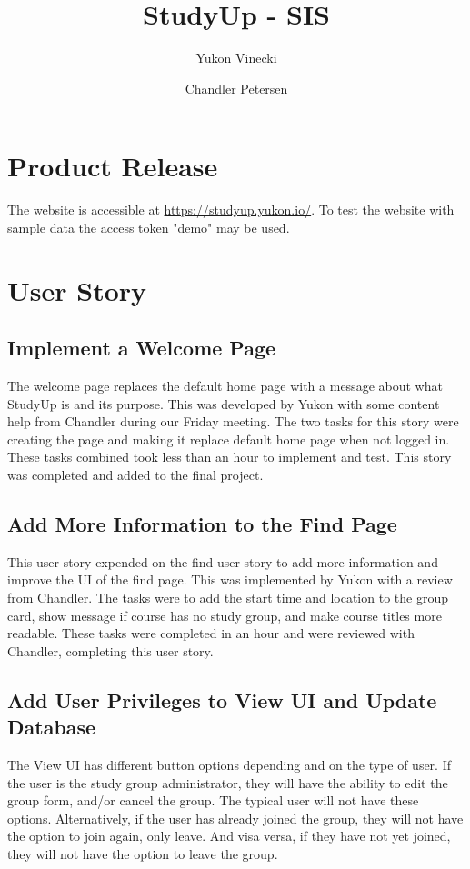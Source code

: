 \documentclass[12pt,letterpaper]{article}
\title{StudyUp - SIS}
\author[1]{Yukon Vinecki}
\author[2]{Chandler Petersen}
\affil[1]{vineckiy, EECS - Oregon State University}
\affil[2]{petercha, EECS - Oregon State University}
\begin{document}
\maketitle
\clearpage
\tableofcontents
\clearpage
{}

\section{Product Release}

The website is accessible at \url{https://studyup.yukon.io/}. To test the website with sample data the access token "demo" may be used.

\section{User Story}
\subsection{Implement a Welcome Page}
The welcome page replaces the default home page with a message about what StudyUp is and its purpose. This was developed by Yukon with some content help from Chandler during our Friday meeting. The two tasks for this story were creating the page and making it replace default home page when not logged in. These tasks combined took less than an hour to implement and test. This story was completed and added to the final project.

\subsection{Add More Information to the Find Page}
This user story expended on the find user story to add more information and improve the UI of the find page. This was implemented by Yukon with a review from Chandler. The tasks were to add the start time and location to the group card, show message if course has no study group, and make course titles more readable. These tasks were completed in an hour and were reviewed with Chandler, completing this user story.

\subsection{Add User Privileges to View UI and Update Database}
The View UI has different button options depending and on the type of user. If the user is the study group administrator, they will have the ability to edit the group form, and/or cancel the group. The typical user will not have these options. Alternatively, if the user has already joined the group, they will not have the option to join again, only leave. And visa versa, if they have not yet joined, they will not have the option to leave the group.
\end{document}
